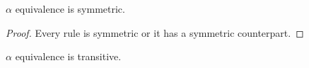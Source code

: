 \begin{lemma}\label{alphaEquivalenceSymmetry}
  $\alpha$ equivalence is symmetric.
  \begin{proof}
    Every rule is symmetric or it has a symmetric counterpart.
  \end{proof}
\end{lemma}

\begin{lemma}\label{alphaEquivalenceTransitive}
  $\alpha$ equivalence is transitive.

\end{lemma}
